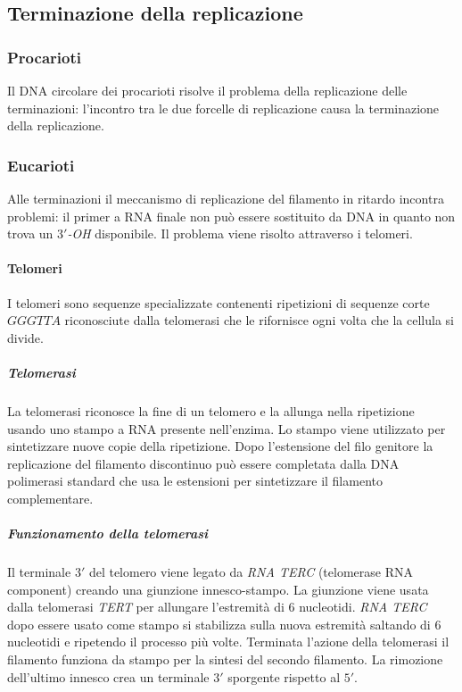 	\subsection{Terminazione della replicazione}

		\subsubsection{Procarioti}
		Il DNA circolare dei procarioti risolve il problema della replicazione delle terminazioni: l'incontro tra le due forcelle di replicazione causa la terminazione della replicazione.

		\subsubsection{Eucarioti}
		Alle terminazioni il meccanismo di replicazione del filamento in ritardo incontra problemi: il primer a RNA finale non pu\`o essere sostituito da DNA in quanto non trova un \emph{$3'$-OH} disponibile.
		Il problema viene risolto attraverso i telomeri.

			\paragraph{Telomeri}
			I telomeri sono sequenze specializzate contenenti ripetizioni di sequenze corte $GGGTTA$ riconosciute dalla telomerasi che le rifornisce ogni volta che la cellula si divide.

				\subparagraph{Telomerasi}
				La telomerasi riconosce la fine di un telomero e la allunga nella ripetizione usando uno stampo a RNA presente nell'enzima.
				Lo stampo viene utilizzato per sintetizzare nuove copie della ripetizione.
				Dopo l'estensione del filo genitore la replicazione del filamento discontinuo pu\`o essere completata dalla DNA polimerasi standard che usa le estensioni per sintetizzare il filamento complementare.

				\subparagraph{Funzionamento della telomerasi}
				Il terminale $3'$ del telomero viene legato da \emph{RNA TERC} (telomerase RNA component) creando una giunzione innesco-stampo.
				La giunzione viene usata dalla telomerasi \emph{TERT} per allungare l'estremit\`a di $6$ nucleotidi.
				\emph{RNA TERC} dopo essere usato come stampo si stabilizza sulla nuova estremit\`a saltando di $6$ nucleotidi e ripetendo il processo pi\`u volte.
				Terminata l'azione della telomerasi il filamento funziona da stampo per la sintesi del secondo filamento.
				La rimozione dell'ultimo innesco crea un terminale $3'$ sporgente rispetto al $5'$.


